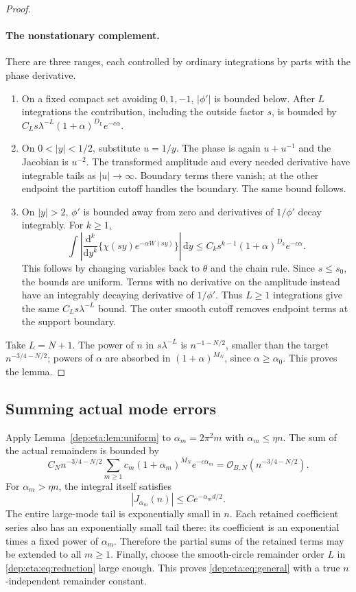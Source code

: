 \documentclass[11pt]{article}
\theoremstyle{definition}\newtheorem{definition}[theorem]{Definition}
\theoremstyle{remark}\newtheorem{remark}[theorem]{Remark}
\newcommand{\OO}{\mathcal O}
\newcommand{\dd}{\,\mathrm d}
\begin{document}
\begin{proof}
\paragraph{The nonstationary complement.}
There are three ranges, each controlled by ordinary integrations by
parts with the phase derivative.
\begin{enumerate}
\item On a fixed compact set avoiding $0,1,-1$, $|\phi'|$ is bounded
below. After $L$ integrations the contribution, including the outside
factor $s$, is bounded by
$C_Ls\lambda^{-L}(1+\alpha)^{D_L}e^{-c\alpha}$.
\item On $0<|y|<1/2$, substitute $u=1/y$. The phase is again
$u+u^{-1}$ and the Jacobian is $u^{-2}$. The transformed amplitude and
every needed derivative have integrable tails as $|u|\to\infty$.
Boundary terms there vanish; at the other endpoint the partition
cutoff handles the boundary. The same bound follows.
\item On $|y|>2$, $\phi'$ is bounded away from zero and derivatives
of $1/\phi'$ decay integrably. For $k\ge1$,
\begin{equation}\label{dep:eta:eq:outerL1}
 \int\left|\frac{\mathrm d^k}{\mathrm dy^k}
       \{\chi(sy)e^{-\alpha W(sy)}\}\right|\dd y
 \le C_ks^{k-1}(1+\alpha)^{D_k}e^{-c\alpha}.
\end{equation}
This follows by changing variables back to $\theta$ and the chain
rule. Since $s\le s_0$, the bounds are uniform. Terms with no
derivative on the amplitude instead have an integrably decaying
derivative of $1/\phi'$. Thus $L\ge1$ integrations give the same
$C_Ls\lambda^{-L}$ bound. The outer smooth cutoff removes endpoint
terms at the support boundary.
\end{enumerate}
Take $L=N+1$. The power of $n$ in $s\lambda^{-L}$ is
$n^{-1-N/2}$, smaller than the target $n^{-3/4-N/2}$; powers of
$\alpha$ are absorbed in $(1+\alpha)^{M_N}$, since
$\alpha\ge\alpha_0$. This proves the lemma.
\end{proof}

\subsection{Summing actual mode errors}
Apply Lemma~\ref{dep:eta:lem:uniform} to $\alpha_m=2\pi^2m$ with
$\alpha_m\le\eta n$. The sum of the actual remainders is bounded by
\begin{equation}\label{dep:eta:eq:sumerror}
 C_Nn^{-3/4-N/2}
   \sum_{m\ge1}c_m(1+\alpha_m)^{M_N}e^{-c\alpha_m}
     =\OO_{B,N}(n^{-3/4-N/2}).
\end{equation}
For $\alpha_m>\eta n$, the integral itself satisfies
\[
 |J_{\alpha_m}(n)|\le C e^{-\alpha_md/2}.
\]
The entire large-mode tail is exponentially small in $n$. Each
retained coefficient series also has an exponentially small tail
there: its coefficient is an exponential times a fixed power of
$\alpha_m$. Therefore the partial sums of the retained terms may be
extended to all $m\ge1$. Finally, choose the smooth-circle remainder
order $L$ in \eqref{dep:eta:eq:reduction} large enough. This proves
\eqref{dep:eta:eq:general} with a true $n$-independent remainder constant.
\end{document}
